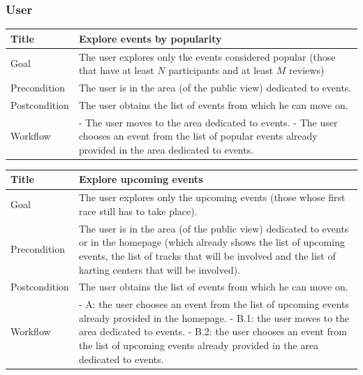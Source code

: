 \documentclass{beamer}
\begin{document}
\begin{frame}
    \frametitle{User}
    \begin{table}
        \tiny
        \begin{tabular}{|p{2cm}|p{6cm}|}
        \hline
        Title & \textbf{Explore events by popularity} \\
        \hline
        Goal & The user explores only the events considered popular (those that have
        at least $N$ participants and at least $M$ reviews) \\
        \hline
        Precondition & The user is in the area (of the public view) dedicated to events.\\
        \hline
        Postcondition & The user obtains the list of events from which he can move on.\\
        \hline
        Workflow &
        - The user moves to the area dedicated to events. \newline
        - The user chooses an event from the list of popular events already provided in the area
        dedicated to events. \\
        \hline
        \end{tabular}
\end{table}

\begin{table}
    \tiny
    \begin{tabular}{|p{2cm}|p{6cm}|}
    \hline
    Title & \textbf{Explore upcoming events} \\
    \hline
    Goal & The user explores only the upcoming events (those whose first race still has to take place). \\
    \hline
    Precondition & The user is in the area (of the public view) dedicated to events or in the homepage (which 
    already shows the list of upcoming events, the list of tracks that will be involved and the list of 
    karting centers that will be involved). \\
    \hline
    Postcondition & The user obtains the list of events from which he can move on.\\
    \hline
    Workflow &
    - A: the user chooses an event from the list of upcoming events already provided in the homepage.\newline
    - B.1: the user moves to the area dedicated to events. \newline
    - B.2: the user chooses an event from the list of upcoming events already provided in the area dedicated
    to events. \\
    \hline
    \end{tabular}
\end{table}
\end{frame}
\end{document}

